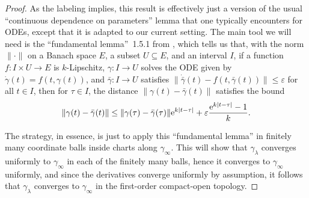 \documentclass[10pt,a4paper]{amsart}
\numberwithin{equation}{section}
\theoremstyle{definition}
\begin{document}
\begin{proof}As the labeling implies, this result is effectively just a version of the usual ``continuous dependence on parameters'' lemma that one typically encounters for ODEs, except that it is adapted to our current setting. The main tool we will need is the ``fundamental lemma''~1.5.1 from \cite[Chapter~2]{HCartan1971}, which tells us that, with the norm $\|\cdot\|$ on a Banach space $E$, a subset $U\subseteq E$, and an interval $I$, if a function $f\colon I\times U\to E$ is $k$-Lipschitz, $\gamma \colon I\to U$ solves the ODE given by $\dot{\gamma}(t)=f(t,\gamma(t))$, and $\bar{\gamma}\colon I\to U$ satisfies $\|\dot{\bar{\gamma}}(t)-f(t,\bar{\gamma}(t))\|\leq\varepsilon$ for all $t\in I$, then for $\tau\in I$, the distance $\|\gamma(t)-\bar{\gamma}(t)\|$ satisfies the bound \[\|\gamma(t)-\bar{\gamma}(t)\|\leq\|\gamma(\tau)-\bar{\gamma}(\tau)\|{\rm e}^{k|t-\tau|}+\varepsilon\frac{{\rm e}^{k|t-\tau|}-1}{k}.\]

The strategy, in essence, is just to apply this ``fundamental lemma'' in finitely many coordinate balls inside charts along $\gamma_\infty$. This will show that $\gamma_\lambda$ converges uniformly to $\gamma_\infty$ in each of the finitely many balls, hence it converges to $\gamma_\infty$ uniformly, and since the derivatives converge uniformly by assumption, it follows that $\gamma_\lambda$ converges to $\gamma_\infty$ in the first-order compact-open topology.


\end{proof}
\end{document}
